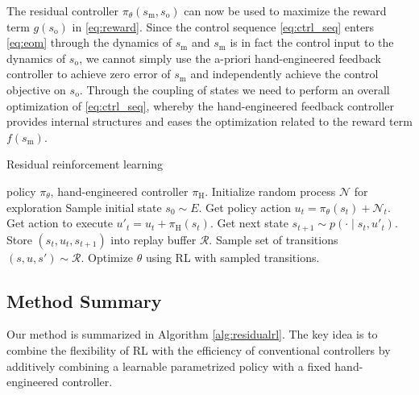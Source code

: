 The residual controller $\pi_\theta(s_\text{m}, s_\text{o})$ can now be used to maximize the reward term $g(s_\text{o})$ in \eqref{eq:reward}.
Since the control sequence \eqref{eq:ctrl_seq} enters \eqref{eq:eom} through the dynamics of $s_\text{m}$ and $s_\text{m}$ is in fact the control input to the dynamics of $s_\text{o}$, we cannot simply use the a-priori hand-engineered feedback controller to achieve zero error of $s_\text{m}$ and independently achieve the control objective on $s_\text{o}$.
Through the coupling of states we need to perform an overall optimization of \eqref{eq:ctrl_seq}, whereby the hand-engineered feedback controller provides internal structures and eases the optimization related to the reward term $f(s_\text{m})$.

\setlength{\textfloatsep}{0.09cm}
\begin{algorithm}
   	\caption{Residual reinforcement learning}
   	\label{alg:residualrl}
   	\begin{algorithmic}[1]
    \REQUIRE policy $\pi_\theta$, hand-engineered controller $\pi_\text{H}$.
        \STATE Initialize random process $\mathcal{N}$ for exploration
        \STATE Sample initial state $s_0 \sim E$.
            \STATE Get policy action $u_t = \pi_\theta(s_t) + \mathcal{N}_t$.
            \STATE Get action to execute $u'_t = u_t + \pi_\text{H}(s_t)$.
            \STATE Get next state $s_{t+1} \sim p(\cdot \mid s_t, u'_t)$.
            \STATE Store $(s_t, u_t, s_{t+1})$ into replay buffer $\mathcal R$.
            \STATE Sample set of transitions $(s, u, s') \sim \mathcal R$.
            \STATE Optimize $\theta$ using RL with sampled transitions.
        \ENDFOR
    \ENDFOR
   	\end{algorithmic}
\end{algorithm}
\setlength{\floatsep}{0.09cm}
\subsection{Method Summary}
Our method is summarized in Algorithm \ref{alg:residualrl}. The key idea is to combine the flexibility of RL with the efficiency of conventional controllers by additively combining a learnable parametrized policy with a fixed hand-engineered controller.

